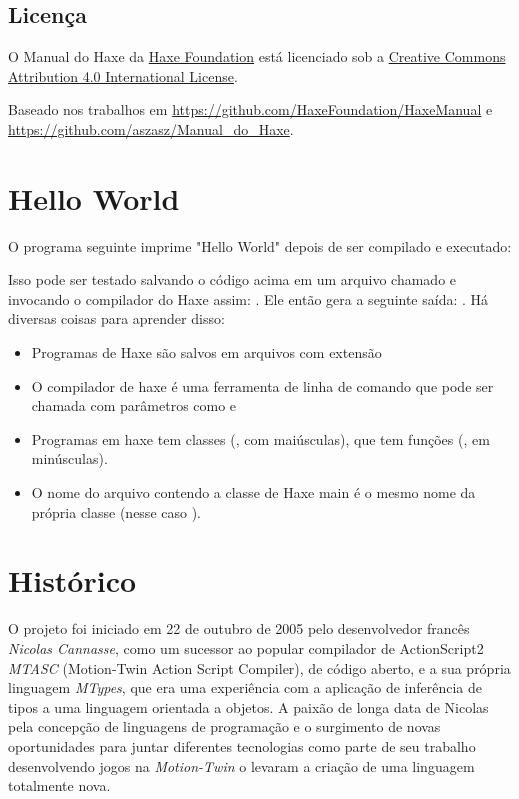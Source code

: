 \subsection{Licença}
\label{introduction-license}

O Manual do Haxe da \href{http://haxe.org/foundation}{Haxe Foundation} está licenciado sob a \href{http://creativecommons.org/licenses/by/4.0/}{Creative Commons Attribution 4.0 International License}.

Baseado nos trabalhos em \href{https://github.com/HaxeFoundation/HaxeManual}{https://github.com/HaxeFoundation/HaxeManual} e\\ \href{https://github.com/aszasz/Manual\_do\_Haxe}{https://github.com/aszasz/Manual\_do\_Haxe}.

\section{Hello World}
\label{introduction-hello-world}

O programa seguinte imprime "Hello World" depois de ser compilado e executado:


Isso pode ser testado salvando o código acima em um arquivo chamado  e invocando o compilador do Haxe assim: . Ele então gera a seguinte saída: . Há diversas coisas para aprender disso:

\begin{itemize}
	\item Programas de Haxe são salvos em arquivos com extensão 
	\item O compilador de haxe é uma ferramenta de linha de comando que pode ser chamada com parâmetros como  e 
	\item Programas em haxe tem classes (, com maiúsculas), que tem funções (, em minúsculas).
	\item O nome do arquivo contendo a classe de Haxe main é o mesmo nome da própria classe (nesse caso ).
\end{itemize}

\section{Histórico}
\label{introduction-haxe-history}

O projeto foi iniciado em 22 de outubro de 2005 pelo desenvolvedor francês \emph{Nicolas Cannasse}, como um sucessor ao popular compilador de ActionScript2 \emph{MTASC} (Motion-Twin Action Script Compiler), de código aberto, e a sua própria linguagem \emph{MTypes}, que era uma experiência com a aplicação de inferência de tipos a uma linguagem orientada a objetos. A paixão de longa data de Nicolas pela concepção de linguagens de programação e o surgimento de novas oportunidades para juntar diferentes tecnologias como parte de seu trabalho desenvolvendo jogos na \emph{Motion-Twin} o levaram a criação de uma linguagem totalmente nova.

